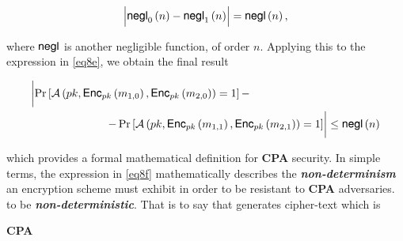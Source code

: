 \documentclass[../CryptoHW3.tex]{subfiles}
\begin{document}
\begin{flushleft}
\begin{align*}
  \Bigl| \text{{\fontfamily{phv}\selectfont negl}}_0 \left( n \right) - \text{{\fontfamily{phv}\selectfont negl}}_1 \left( n \right) \Bigr| = \text{{\fontfamily{phv}\selectfont negl}} \left( n \right),
\end{align*}

where $\text{{\fontfamily{phv}\selectfont negl}}$ is another negligible function, of order $n$.  Applying this to the expression in \ref{eq8e}, we obtain the final result

\begin{align}
  &\biggl| \Pr \left[ \mathcal{A} \left( pk,  \text{{\fontfamily{phv}\selectfont Enc}}_{pk} \left( m_{1, 0} \right), \text{{\fontfamily{phv}\selectfont Enc}}_{pk} \left( m_{2, 0} \right) \right) = 1 \right] - \biggr. \notag \\
  &\biggl. \qquad \qquad \qquad \quad - \Pr \left[ \mathcal{A} \left( pk,  \text{{\fontfamily{phv}\selectfont Enc}}_{pk} \left( m_{1, 1} \right), \text{{\fontfamily{phv}\selectfont Enc}}_{pk} \left( m_{2, 1} \right) \right) = 1 \right] \biggr| \leq \text{{\fontfamily{phv}\selectfont negl}} \left( n \right) \label{eq8f}
\end{align}

which provides a formal mathematical definition for \textbf{CPA} security.  In simple terms, the expression in \ref{eq8f} mathematically describes the \textbf{\emph{non-determinism}} an  encryption scheme must exhibit in order to be resistant to \textbf{CPA} adversaries.  \\

to be \textbf{\emph{non-deterministic}}.  That is to say that generates cipher-text which is 






 \textbf{CPA}

























\end{flushleft}
\end{document}
